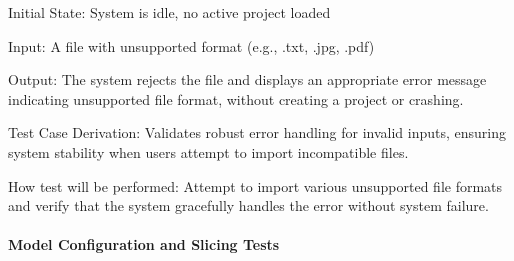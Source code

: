 \documentclass[12pt, titlepage]{article}
\begin{document}
\begin{enumerate}
Initial State: System is idle, no active project loaded
					
Input: A file with unsupported format (e.g., .txt, .jpg, .pdf)
					
Output: The system rejects the file and displays an appropriate error message indicating
unsupported file format, without creating a project or crashing.

Test Case Derivation: Validates robust error handling for invalid inputs, ensuring system
stability when users attempt to import incompatible files.
					
How test will be performed: Attempt to import various unsupported file formats and verify
that the system gracefully handles the error without system failure.

\end{enumerate}

\paragraph{Model Configuration and Slicing Tests}
\end{document}
